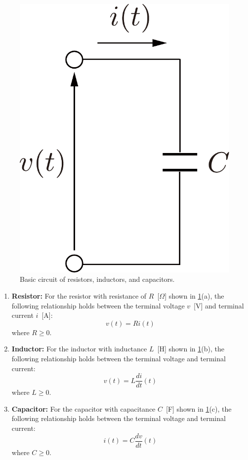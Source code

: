 \documentclass[graybox, envcountchap]{svmult}
\begin{document}
\begin{figure}[t]
{\begin{minipage}{0.3\linewidth}
      \subcaption{}
      \medskip
    \end{minipage}
    \begin{minipage}{0.3\linewidth}
      \centering
      \includegraphics[width = .7\linewidth]{figs/circcond}
      \subcaption{}
      \medskip
    \end{minipage}
  }
  \medskip
  \caption{\centering Basic circuit of resistors, inductors, and
  capacitors.}
  \label{fig:basiccirc} 
  \medskip
\end{figure}

\smallskip
\begin{enumerate}[label=(\alph*)]
  \item \textbf{Resistor:} For the resistor with resistance of $R$~[$\Omega$]
  shown in \ref{fig:basiccirc}(a), the following relationship holds between the
  terminal voltage $v$~[V] and terminal current $i$~[A]:
  \begin{equation}
    v(t) = R i(t)
  \end{equation}
  where $R\geq 0$.
  \bigskip
  \item \textbf{Inductor:} For the inductor with inductance $L$~[H] shown in
  \ref{fig:basiccirc}(b), the following relationship holds between the terminal
  voltage and terminal current:
  \begin{equation}
    v(t) = L \frac{di}{dt}(t)
  \end{equation}
  where $L\geq 0$.
  \bigskip
  \item \textbf{Capacitor:} For the capacitor with capacitance $C$~[F] shown in
  \ref{fig:basiccirc}(c), the following relationship holds between the terminal
  voltage and terminal current:
  \begin{equation}
    i(t) = C \frac{dv}{dt}(t)
  \end{equation}
  where $C\geq 0$.
\end{enumerate}
\end{document}
